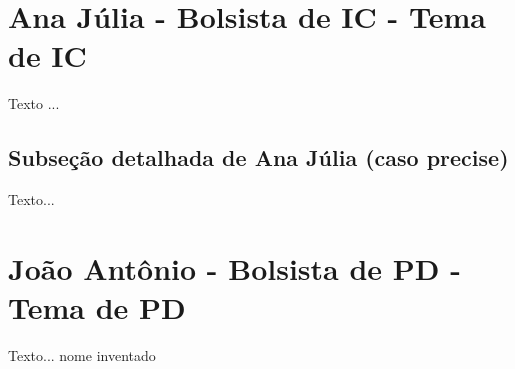 

\section{Ana Júlia - Bolsista de IC - Tema de IC}
Texto ...

\subsection{Subseção detalhada de Ana Júlia (caso precise)}
Texto...

\section{João Antônio - Bolsista de PD - Tema de PD}
Texto... nome inventado

